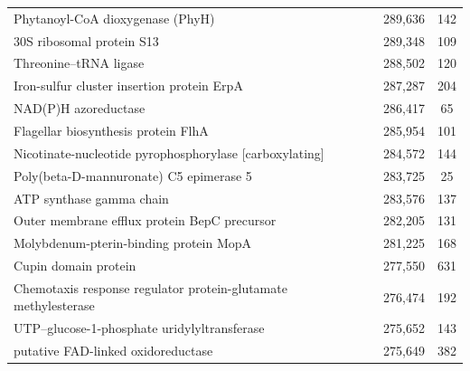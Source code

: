 \begin{singlespace}
\begin{longtable}{p{} cc}
                                                          Phytanoyl-CoA dioxygenase (PhyH) &                     289,636 &           142 \\
                                                                 30S ribosomal protein S13 &                     289,348 &           109 \\
                                                                    Threonine--tRNA ligase &                     288,502 &           120 \\
                                                Iron-sulfur cluster insertion protein ErpA &                     287,287 &           204 \\
                                                                      NAD(P)H azoreductase &                     286,417 &            65 \\
                                                       Flagellar biosynthesis protein FlhA &                     285,954 &           101 \\
                                   Nicotinate-nucleotide pyrophosphorylase [carboxylating] &                     284,572 &           144 \\
                                                   Poly(beta-D-mannuronate) C5 epimerase 5 &                     283,725 &            25 \\
                                                                  ATP synthase gamma chain &                     283,576 &           137 \\
                                              Outer membrane efflux protein BepC precursor &                     282,205 &           131 \\
                                                    Molybdenum-pterin-binding protein MopA &                     281,225 &           168 \\
                                                                      Cupin domain protein &                     277,550 &           631 \\
                            Chemotaxis response regulator protein-glutamate methylesterase &                     276,474 &           192 \\
                                              UTP--glucose-1-phosphate uridylyltransferase &                     275,652 &           143 \\
                                                        putative FAD-linked oxidoreductase &                     275,649 &           382 \\
\end{longtable}
\end{singlespace}


